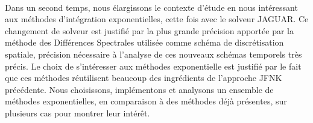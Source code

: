     \paragraph{}
    Dans un second temps, nous élargissons le contexte d'étude en nous intéressant aux méthodes d'intégration exponentielles, cette fois avec le solveur JAGUAR.
    Ce changement de solveur est justifié par la plus grande précision apportée par la méthode des Différences Spectrales utilisée comme schéma de discrétisation spatiale, précision nécessaire à l'analyse de ces nouveaux schémas temporels très précis.
    Le choix de s'intéresser aux méthodes exponentielle est justifié par le fait que ces méthodes réutilisent beaucoup des ingrédients de l'approche JFNK précédente.
    Nous choisissons, implémentons et analysons un ensemble de méthodes exponentielles, en comparaison à des méthodes déjà présentes, sur plusieurs cas pour montrer leur intérêt.





